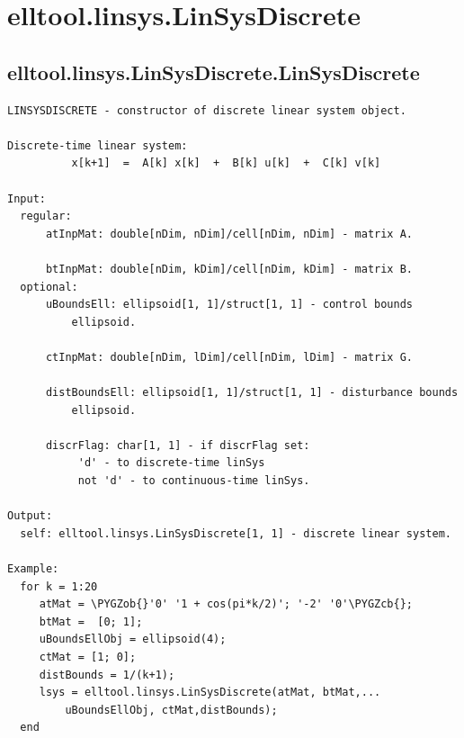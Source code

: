 \documentclass[letterpaper,10pt,english]{sphinxmanual}
\def\PYGZob{\char`\{}
\def\PYGZcb{\char`\}}
\begin{document}
\section{elltool.linsys.LinSysDiscrete}
\label{chap_functions:elltool-linsys-linsysdiscrete}

\subsection{elltool.linsys.LinSysDiscrete.LinSysDiscrete}
\label{chap_functions:elltool-linsys-linsysdiscrete-linsysdiscrete}
\begin{Verbatim}[commandchars=\\\{\}]
LINSYSDISCRETE - constructor of discrete linear system object.

Discrete-time linear system:
          x[k+1]  =  A[k] x[k]  +  B[k] u[k]  +  C[k] v[k]

Input:
  regular:
      atInpMat: double[nDim, nDim]/cell[nDim, nDim] - matrix A.

      btInpMat: double[nDim, kDim]/cell[nDim, kDim] - matrix B.
  optional:
      uBoundsEll: ellipsoid[1, 1]/struct[1, 1] - control bounds
          ellipsoid.

      ctInpMat: double[nDim, lDim]/cell[nDim, lDim] - matrix G.

      distBoundsEll: ellipsoid[1, 1]/struct[1, 1] - disturbance bounds
          ellipsoid.

      discrFlag: char[1, 1] - if discrFlag set:
           'd' - to discrete-time linSys
           not 'd' - to continuous-time linSys.

Output:
  self: elltool.linsys.LinSysDiscrete[1, 1] - discrete linear system.

Example:
  for k = 1:20
     atMat = \PYGZob{}'0' '1 + cos(pi*k/2)'; '-2' '0'\PYGZcb{};
     btMat =  [0; 1];
     uBoundsEllObj = ellipsoid(4);
     ctMat = [1; 0];
     distBounds = 1/(k+1);
     lsys = elltool.linsys.LinSysDiscrete(atMat, btMat,...
         uBoundsEllObj, ctMat,distBounds);
  end
\end{Verbatim}
\end{document}
